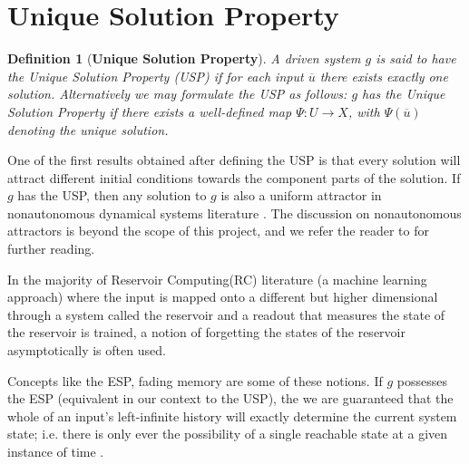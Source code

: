 \documentclass[a4paper,12pt,twoside]{report}
\newtheorem{Definition}{Definition}[]
\begin{document}

\section{Unique Solution Property}

\begin{Definition}
  [\bf Unique Solution Property] \label{Dfn_usp}\rm
  A driven system $g$ is said to have the Unique Solution Property (USP) if for each input $\overline{u}$ there exists exactly one solution. 
  Alternatively we may formulate the USP as follows: $g$ has the Unique Solution Property if there exists a well-defined map $\Psi:{U}\to{X}$, with $\Psi({\overline{u}})$ denoting the unique solution.
\end{Definition}

One of the first results obtained after defining the USP is that every solution will attract different initial conditions towards the component parts of the solution. 
If $g$ has the USP, then any solution to $g$ is also a uniform attractor in nonautonomous dynamical systems literature \cite{Manju_Nonlinearity}. The discussion on nonautonomous attractors is beyond the scope of this project, and we refer the reader to \cite{Manju_ESP, esann2012ids} for further reading. 


In the majority of Reservoir Computing(RC) literature (a machine learning approach) where the input is mapped onto a different but higher dimensional through a system called the reservoir and a readout that measures the state of the reservoir is trained, a notion of forgetting the states of the reservoir asymptotically is often used.  

Concepts like the ESP,  fading memory \cite{boyd1985fading} are some of these notions.  
If $g$ possesses the ESP (equivalent in our context to the USP), the we are guaranteed that the whole of an input's left-infinite history will exactly determine the current system state; i.e. there is only ever the possibility of a single reachable state at a given instance of time \cite{jaeger2001echo,Manju_2020}.
\end{document}
